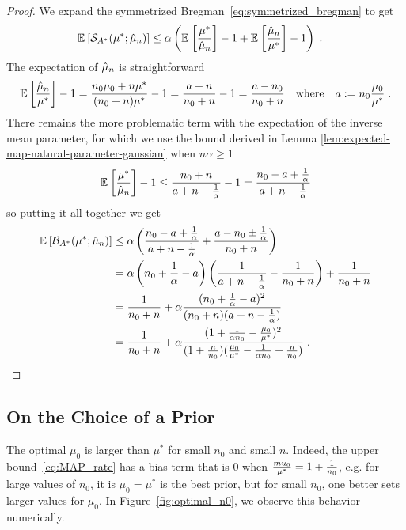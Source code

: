 \begin{proof}
We expand the symmetrized Bregman~\eqref{eq:symmetrized_bregman} to get
\begin{align}
	\mathbb{E}_{} \left[ {\mathcal S}_{A^*}(\mu^*; \hat {\mu}_n) \right]  
	&\leq \alpha \left(\mathbb{E}_{} \left[ \frac{\mu^*}{\hat {\mu}_n} \right]  -1  + \mathbb{E}_{} \left[ \frac{\hat {\mu}_n}{\mu^*} \right]  - 1\right) \; .
\end{align}
The expectation of $\hat {\mu}_n$ is straightforward
\begin{align}
	 \mathbb{E}_{} \left[ \frac{\hat {\mu}_n}{\mu^*} \right]  - 1 
	 = \frac{n_0 \mu_0 + n \mu^*}{(n_0+n)\mu^*} - 1 
	 = \frac{a+n}{n_0+n} - 1 = \frac{a - n_0}{n_0+n}
	 \quad \text{where} \quad
	 a:=n_0\frac{\mu_0}{\mu^*} \; .
\end{align}
There remains the more problematic term with the expectation of the inverse mean parameter, 
for which we use the bound derived in Lemma \ref{lem:expected-map-natural-parameter-gaussian}  when $n\alpha \geq 1$
\begin{align}
	\mathbb{E}_{} \left[ \frac{\mu^*}{\hat {\mu}_n} \right]  - 1 
	\leq \frac{n_0 + n}{a +n - \frac{1}{\alpha}} -1
	= \frac{n_0 - a + \frac{1}{\alpha}}{a +n - \frac{1}{\alpha}}
\end{align}
so putting it all together we get 
\begin{align}
	\mathbb{E}_{} \left[ {\mathcal B}_{A^*}(\mu^*; \hat {\mu}_n) \right]  
	&\leq 
	\alpha \left(\frac{n_0 - a + \frac{1}{\alpha}}{a +n - \frac{1}{\alpha}} 
	 + \frac{a - n_0 \pm \frac{1}{\alpha}}{n_0+n}\right) \\
	 &=
	 \alpha \left(n_0 + \frac{1}{\alpha} -a\right)  
	 \left( \frac{1}{a+n-\frac{1}{\alpha}} - \frac{1}{n_0+n} \right)
	 + \frac{1}{n_0 + n} \\
	 &= \frac{1}{n_0 + n} + \alpha \frac{(n_0 + \frac{1}{\alpha} - a)^2}{(n_0 + n)(a+ n - \frac{1}{\alpha} )} \\
	&= \frac{1}{n_0 + n} + \alpha \frac{(1 + \frac{1}{\alpha n_0} - \frac{\mu_0}{\mu^*})^2}{ (1 + \frac{n}{n_0} ) (\frac{\mu_0}{\mu^*} - \frac{1}{\alpha n_0} +\frac{n}{n_0})} \; .
\end{align}
\end{proof}



\subsection{On the Choice of a Prior}
\label{app:prior-choice}
The optimal $\mu_0$ is larger than $\mu^*$ for small $n_0$ and small $n$.
Indeed, the upper bound~\eqref{eq:MAP_rate} has a bias term that is $0$ when $\frac{mu_0}{\mu^*} = 1 + \frac{1}{n_0}$, e.g. for large values of $n_0$, it is $\mu_0=\mu^*$ is the best prior, but for small $n_0$, one better sets larger values for $\mu_0$. In Figure~\ref{fig:optimal_n0}, we observe this behavior numerically.

